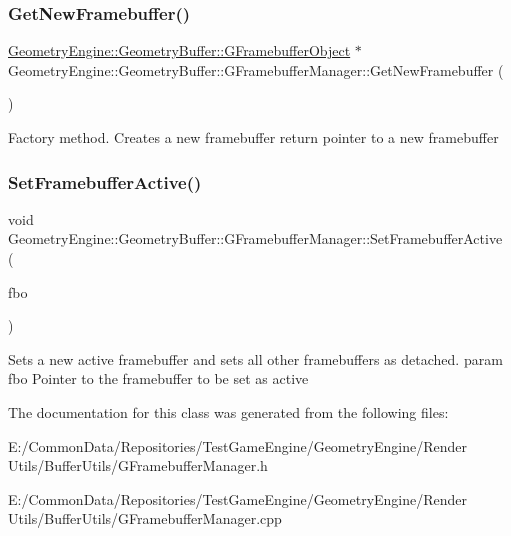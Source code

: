 \subsubsection{\texorpdfstring{GetNewFramebuffer()}{GetNewFramebuffer()}}
{\footnotesize\ttfamily \mbox{\hyperlink{class_geometry_engine_1_1_geometry_buffer_1_1_g_framebuffer_object}{Geometry\+Engine\+::\+Geometry\+Buffer\+::\+G\+Framebuffer\+Object}} $\ast$ Geometry\+Engine\+::\+Geometry\+Buffer\+::\+G\+Framebuffer\+Manager\+::\+Get\+New\+Framebuffer (\begin{DoxyParamCaption}{ }\end{DoxyParamCaption})}

Factory method. Creates a new framebuffer return pointer to a new framebuffer \mbox{\label{class_geometry_engine_1_1_geometry_buffer_1_1_g_framebuffer_manager_a8f42a16dacecdc9422b88c71cfb38889}} 
\subsubsection{\texorpdfstring{SetFramebufferActive()}{SetFramebufferActive()}}
{\footnotesize\ttfamily void Geometry\+Engine\+::\+Geometry\+Buffer\+::\+G\+Framebuffer\+Manager\+::\+Set\+Framebuffer\+Active (\begin{DoxyParamCaption}\item[{\mbox{\hyperlink{class_geometry_engine_1_1_geometry_buffer_1_1_g_framebuffer_object}{G\+Framebuffer\+Object}} $\ast$}]{fbo }\end{DoxyParamCaption})}

Sets a new active framebuffer and sets all other framebuffers as detached. param fbo Pointer to the framebuffer to be set as active 

The documentation for this class was generated from the following files\+:\begin{DoxyCompactItemize}
\item 
E\+:/\+Common\+Data/\+Repositories/\+Test\+Game\+Engine/\+Geometry\+Engine/\+Render Utils/\+Buffer\+Utils/G\+Framebuffer\+Manager.\+h\item 
E\+:/\+Common\+Data/\+Repositories/\+Test\+Game\+Engine/\+Geometry\+Engine/\+Render Utils/\+Buffer\+Utils/G\+Framebuffer\+Manager.\+cpp\end{DoxyCompactItemize}
